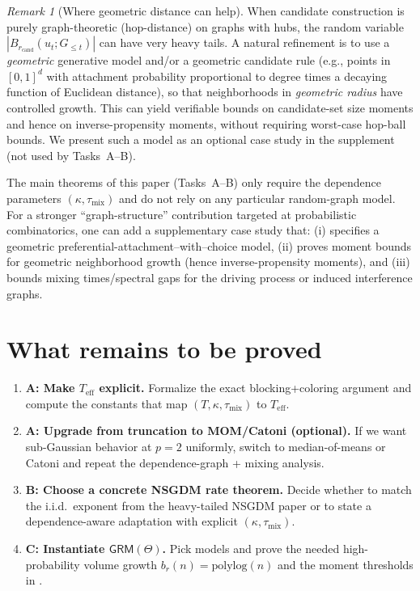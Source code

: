 \documentclass[11pt]{article}
\newcommand{\1}{\mathbf{1}}
\newcommand{\polylog}{\mathrm{polylog}}
\theoremstyle{plain}
\theoremstyle{definition}
\theoremstyle{remark}
\newtheorem{remark}[theorem]{Remark}
\begin{document}
\begin{remark}[Where geometric distance can help]\label{rem:geom}
When candidate construction is purely graph-theoretic (hop-distance) on graphs with hubs, the random variable
$|B_{r_{\mathrm{cand}}}(u_t;G_{\le t})|$ can have very heavy tails.
A natural refinement is to use a \emph{geometric} generative model and/or a geometric candidate rule
(e.g., points in $[0,1]^d$ with attachment probability proportional to degree times a decaying function of Euclidean distance),
so that neighborhoods in \emph{geometric radius} have controlled growth.  This can yield verifiable bounds on
candidate-set size moments and hence on inverse-propensity moments, without requiring worst-case hop-ball bounds.
We present such a model as an optional case study in the supplement (not used by Tasks~A--B).
\end{remark}



The main theorems of this paper (Tasks~A--B) only require the dependence parameters $(\kappa,\tau_{\mathrm{mix}})$
and do not rely on any particular random-graph model.  For a stronger ``graph-structure'' contribution targeted at
probabilistic combinatorics, one can add a supplementary case study that:
(i) specifies a geometric preferential-attachment--with--choice model,
(ii) proves moment bounds for geometric neighborhood growth (hence inverse-propensity moments),
and (iii) bounds mixing times/spectral gaps for the driving process or induced interference graphs.


\section{What remains to be proved}
\label{sec:todo}

\begin{enumerate}[leftmargin=2em]
\item \textbf{A: Make $T_{\mathrm{eff}}$ explicit.} Formalize the exact blocking+coloring argument
and compute the constants that map $(T,\kappa,\tau_{\mathrm{mix}})$ to $T_{\mathrm{eff}}$.
\item \textbf{A: Upgrade from truncation to MOM/Catoni (optional).} If we want sub-Gaussian behavior at $p=2$ uniformly,
switch to median-of-means or Catoni and repeat the dependence-graph + mixing analysis.
\item \textbf{B: Choose a concrete NSGDM rate theorem.} Decide whether to match the i.i.d.\ exponent from the heavy-tailed NSGDM paper
or to state a dependence-aware adaptation with explicit $(\kappa,\tau_{\mathrm{mix}})$.
\item \textbf{C: Instantiate $\mathsf{GRM}(\Theta)$.} Pick models and prove the needed high-probability volume growth $b_r(n)=\polylog(n)$ and the moment thresholds in .
\end{enumerate}
\end{document}
